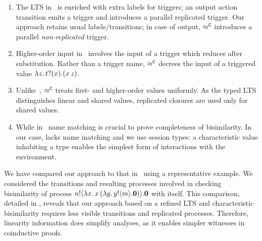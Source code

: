 \begin{enumerate}[$\bullet$]
\item 
The LTS in~\cite{JeffreyR05} is enriched with extra labels for triggers;
an output action transition emits a trigger and introduces a parallel replicated trigger.
Our 
approach retains usual labels/transitions; in  case of output,
$\approx^\mathtt{C}$
introduces a parallel
\emph{non-replicated} trigger.

\item Higher-order input in~\cite{JeffreyR05} involves 
the input of a trigger which reduces after substitution.
Rather than a trigger name, %
$\approx^\mathtt{C}$
decrees the input of a triggered value $\lambda z.\,t ? (x) . (x\, {z})$.

\item Unlike~\cite{JeffreyR05}, 
$\approx^\mathtt{C}$ treats  
first- and higher-order values uniformly. %
As the typed LTS distinguishes linear and shared values,
replicated closures are used only for shared values.

\item While in~\cite{JeffreyR05}   name matching   is
crucial to prove completeness of bisimilarity.
In our case, \HOp lacks name matching and 
we use session types: a characteristic value inhabiting a type enables the simplest form of interactions with the environment.


\end{enumerate}
\noi 
We have compared our approach to that in~\cite{JeffreyR05} 
using a representative example.
We considered the transitions and resulting processes involved in checking bisimilarity of process 
$n ! \langle \lambda x.\,x\, {(}\lambda y.\,y ! \langle m \rangle . \mathbf{0}) \rangle . \mathbf{0}$
with itself.
This comparison, detailed in , reveals that our approach 
based on %
a refined LTS and characteristic bisimilarity 
requires less visible transitions and replicated processes. 
Therefore, linearity information does simplify analyses, 
as it enables simpler witnesses in  coinductive proofs.


